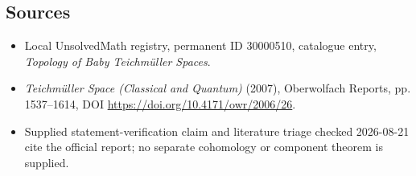 \documentclass[11pt]{article}
\begin{document}
\subsection{Sources}
\begin{itemize}
\item Local UnsolvedMath registry, permanent ID 30000510, catalogue entry, \emph{Topology of Baby Teichm\"uller Spaces}.
\item \emph{Teichm\"uller Space (Classical and Quantum)} (2007), Oberwolfach Reports, pp. 1537--1614, DOI \url{https://doi.org/10.4171/owr/2006/26}.
\item Supplied statement-verification claim and literature triage checked 2026-08-21 cite the official report; no separate cohomology or component theorem is supplied.
\end{itemize}
\end{document}
